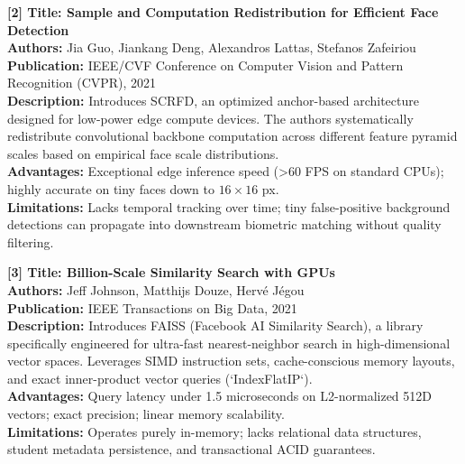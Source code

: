 \vspace{0.15in}
\begin{flushleft}
{\fontsize{12pt}{14pt}\selectfont \textbf{[2] Title: Sample and Computation Redistribution for Efficient Face Detection}} \\
\textbf{Authors:} Jia Guo, Jiankang Deng, Alexandros Lattas, Stefanos Zafeiriou \\
\textbf{Publication:} IEEE/CVF Conference on Computer Vision and Pattern Recognition (CVPR), 2021 \\
\textbf{Description:} Introduces SCRFD, an optimized anchor-based architecture designed for low-power edge compute devices. The authors systematically redistribute convolutional backbone computation across different feature pyramid scales based on empirical face scale distributions. \\
\textbf{Advantages:} Exceptional edge inference speed (>60 FPS on standard CPUs); highly accurate on tiny faces down to $16 \times 16$ px. \\
\textbf{Limitations:} Lacks temporal tracking over time; tiny false-positive background detections can propagate into downstream biometric matching without quality filtering.
\end{flushleft}

\vspace{0.15in}
\begin{flushleft}
{\fontsize{12pt}{14pt}\selectfont \textbf{[3] Title: Billion-Scale Similarity Search with GPUs}} \\
\textbf{Authors:} Jeff Johnson, Matthijs Douze, Herv{\'e} J{\'e}gou \\
\textbf{Publication:} IEEE Transactions on Big Data, 2021 \\
\textbf{Description:} Introduces FAISS (Facebook AI Similarity Search), a library specifically engineered for ultra-fast nearest-neighbor search in high-dimensional vector spaces. Leverages SIMD instruction sets, cache-conscious memory layouts, and exact inner-product vector queries (`IndexFlatIP`). \\
\textbf{Advantages:} Query latency under 1.5 microseconds on L2-normalized 512D vectors; exact precision; linear memory scalability. \\
\textbf{Limitations:} Operates purely in-memory; lacks relational data structures, student metadata persistence, and transactional ACID guarantees.
\end{flushleft}

